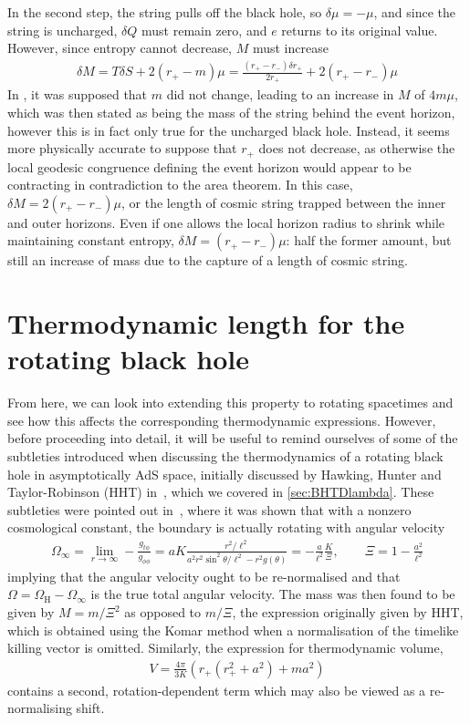 \documentclass[
twoside,
openright,
frontopenright,
]{dmathesis}
\begin{document}
In the second step, the string pulls off the black hole, so $\delta \mu = -\mu$,
and since the string is uncharged, $\delta Q$ must remain zero, and $e$ 
returns to its original value. However, since entropy cannot decrease, 
$M$ must increase
\begin{align}
\delta M = T\delta S + 2(r_+-m)\mu
= \frac{(r_+-r_-) \delta r_+}{2r_+} + 2(r_+-r_-)\mu 
\end{align}
In \cite{Bonjour:1998rf}, it was supposed that $m$ did not change, leading to an
increase in $M$ of $4m\mu$, which was then stated as being the mass of the
string behind the event horizon, however this is in fact only true for the
uncharged black hole. Instead, it seems more physically accurate to suppose that
$r_+$ does not decrease, as otherwise the local geodesic congruence defining the
event horizon would appear to be contracting in contradiction to the area
theorem.  In this case, $\delta M = 2 (r_+-r_-) \mu$, or the length of cosmic
string trapped between the inner and outer horizons. Even if one allows the
local horizon radius to shrink while maintaining constant entropy,
$\delta M = (r_+ - r_-)\mu$: half the former amount, but still an increase of
mass due to the capture of a length of cosmic string.

\section{Thermodynamic length for the rotating black hole}
\label{sec:therm-length-rotat}

From here, we can look into extending this property to rotating spacetimes and
see how this affects the corresponding thermodynamic expressions. However,
before proceeding into detail, it will be useful to remind ourselves of some of
the subtleties introduced when discussing the thermodynamics of a rotating black
hole in asymptotically AdS space, initially discussed by Hawking, Hunter and
Taylor-Robinson (HHT) in~\cite{Hawking:1998kw}, which we covered in
\cref{sec:BHTDlambda}. These subtleties were pointed out
in~\cite{Caldarelli:1999xj,Gibbons:2004ai}, where it was shown that with a
nonzero cosmological constant, the boundary is actually rotating with angular
velocity
\begin{align}
\Omega_\infty = \lim_{r\to\infty} -\frac{g_{t\phi}}{g_{\phi\phi}} = aK
  \frac{r^2/\ell^2}{a^2 r^2 \sin^2\theta/\ell^2- r^2 g(\theta)} = -
  \frac{a}{\ell^2} \frac{K}{\Xi}, \qquad \Xi = 1-\frac{a^2}{\ell^2}
\end{align}
implying that the angular velocity ought to be re-normalised and that
$\Omega = \Omega_\mathrm{H} - \Omega_\infty$ is the true total angular
velocity. The mass was then found to be given by $M=m/\Xi^2$ as opposed to
$m/\Xi$, the expression originally given by HHT, which is obtained using the
Komar method when a normalisation of the timelike killing vector is
omitted. Similarly, the expression for thermodynamic volume,
\begin{align}
  \label{eq:volKerrAdS}
V = \frac{4\pi}{3K} \left( r_+(r_+^2+a^2) + ma^2 \right)
\end{align}
contains a second, rotation-dependent term which may also be viewed as a
re-normalising shift.
\end{document}
